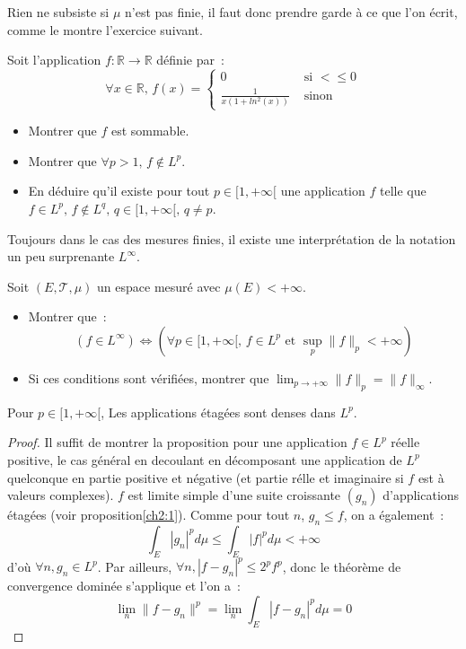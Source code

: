\begin{rem}
Rien ne subsiste si $\mu$ n'est pas finie, il faut donc prendre garde à ce que
l'on écrit, comme le montre l'exercice suivant.
\end{rem}
\begin{exercice}
Soit l'application $f : \mathbb{R} \to \mathbb{R}$ définie par~:
\[
\forall x \in \mathbb{R}, \, f(x) = \left \{
\begin{array}{cc}
0 & \mbox { si } < \leq 0 \\
\frac{1}{x(1+ln^2(x))} & \mbox{ sinon }
\end{array}
\right .
\]
\begin{itemize}
\item Montrer que $f$ est sommable.
\item Montrer que $ \forall p > 1, \, f \notin L^p$.
\item En déduire qu'il existe pour tout $p \in [1, +\infty[$ une application $f$ telle que 
$f\in L^p, \, f \notin  L^q, \, q \in  [1, +\infty[, \, q \neq p$.
\end{itemize}
\end{exercice}
Toujours dans le cas des mesures finies, il existe une interprétation de la
notation un peu surprenante $L^\infty$. 
\begin{exercice}
Soit $(E,\mathcal{T},\mu)$ un espace mesuré avec $\mu(E) < +\infty$.
\begin{itemize}
\item Montrer que~:
\[
(f \in L^\infty) \Leftrightarrow \left(\forall p \in [1, +\infty[, \, 
f \in L^p \mbox { et } \sup_p \| f\|_p < +\infty\right)
\]
\item Si ces conditions sont vérifiées, montrer que $\lim_{p \to +\infty}
\|f\|_p = \|f\|_\infty$.
\end{itemize}
\end{exercice}
\begin{theorem}
Pour $p \in [1,+\infty[$, Les applications étagées sont denses dans $L^p$.
\end{theorem}
\begin{proof}
Il suffit de montrer la proposition pour une application $f \in L^p$ réelle positive, le cas
général en decoulant en décomposant une application de $L^p$
quelconque en partie positive et négative (et partie rélle et
imaginaire si $f$ est à valeurs complexes). 
$f$ est limite simple d'une suite croissante $(g_n)$ d'applications étagées
(voir proposition\ref{ch2:1}). Comme pour tout $n$, $g_n \leq f$, on a
également~:
\[
\int_E |g_n|^p d \mu \leq \int_E |f|^p d \mu < +\infty
\]
d'où $\forall n, g_n \in L^p$. Par ailleurs, $\forall n, |f- g_n|^p
\leq 2^p f^p$, donc le théorème de convergence dominée s'applique et l'on
a~:
\[
\lim_n \|f-g_n\|^p = \lim_n \int_E |f - g_n|^p d \mu = 0
\]
\end{proof}
